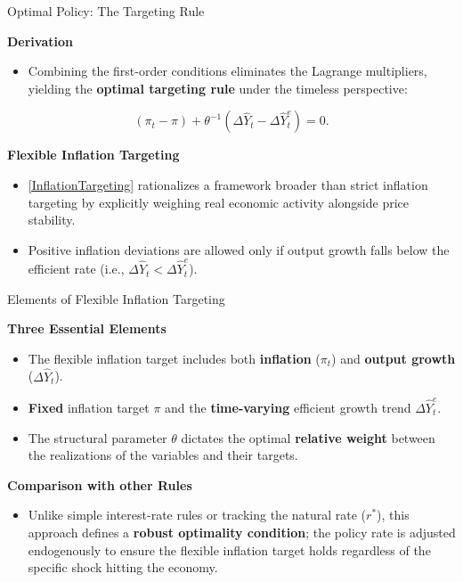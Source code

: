 \documentclass[11pt,aspectratio=169]{beamer}
\begin{document}
\begin{frame}{Optimal Policy: The Targeting Rule}
\small

\textbf{Derivation}
\begin{itemize}
  \item Combining the first-order conditions eliminates the Lagrange multipliers, yielding the \textbf{optimal targeting rule} under the timeless perspective:
\end{itemize}

\begin{equation}
(\pi _{t}-\pi ) + \theta^{-1}(\Delta \hat{Y}_{t}-\Delta \hat{Y}_{t}^{e}) = 0.
\label{InflationTargeting}
\end{equation}

\vspace{0.2cm}

\textbf{Flexible Inflation Targeting}
\begin{itemize}
  \item \eqref{InflationTargeting} rationalizes a framework broader than strict inflation targeting by explicitly weighing real economic activity alongside price stability.
  \item Positive inflation deviations are allowed only if output growth falls below the efficient rate (i.e., $\Delta \hat{Y}_{t} < \Delta \hat{Y}_{t}^{e}$).
\end{itemize}

\end{frame}
\begin{frame}{Elements of Flexible Inflation Targeting}
\small

\textbf{Three Essential Elements}
\begin{itemize}
  \item The flexible inflation target includes both \textbf{inflation} ($\pi_t$) and \textbf{output growth} ($\Delta \hat{Y}_t$).
  \item \textbf{Fixed} inflation target $\pi$ and the \textbf{time-varying} efficient growth trend $\Delta \hat{Y}_{t}^{e}$.
  \item The structural parameter $\theta$ dictates the optimal \textbf{relative weight} between the realizations of the variables and their targets.
\end{itemize}

\vspace{0.3cm}

\textbf{Comparison with other Rules}
\begin{itemize}
  \item Unlike simple interest-rate rules or tracking the natural rate ($r^\ast$), this approach defines a \textbf{robust optimality condition}; the policy rate is adjusted endogenously to ensure the flexible inflation target holds regardless of the specific shock hitting the economy.
\end{itemize}

\end{frame}
\end{document}
